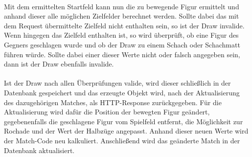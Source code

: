 \\
Mit dem ermittelten Startfeld kann nun die zu bewegende Figur ermittelt und anhand dieser alle möglichen Zielfelder berechnet werden. Sollte dabei das mit dem Request übermittelte Zielfeld nicht enthalten sein, so ist der Draw invalide. Wenn hingegen das Zielfeld enthalten ist, so wird überprüft, ob eine Figur des Gegners geschlagen wurde und ob der Draw zu einem Schach oder Schachmatt führen würde. Sollte dabei einer dieser Werte nicht oder falsch angegeben sein, dann ist der Draw ebenfalls invalide.\\
\\
Ist der Draw nach allen Überprüfungen valide, wird dieser schließlich in der Datenbank gespeichert und das erzeugte Objekt wird, nach der Aktualisierung des dazugehörigen Matches, als \gls{HTTP}-Response zurückgegeben. Für die Aktualisierung wird dafür die Position der bewegten Figur geändert, gegebenenfalls die geschlagene Figur vom Spielfeld entfernt, die Möglichkeit zur Rochade und der Wert der Halbzüge angepasst. Anhand dieser neuen Werte wird der Match-Code neu kalkuliert. Anschließend wird das geänderte Match in der Datenbank aktualisiert.
